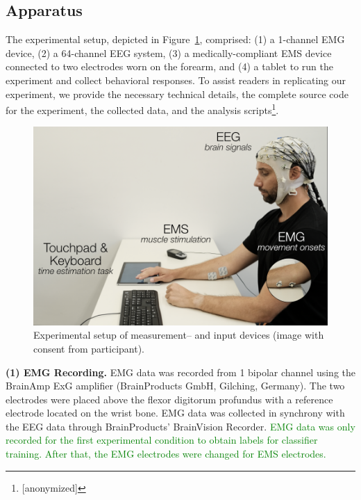 
\subsection{Apparatus}
The experimental setup, depicted in Figure~\ref{fig:setup}, comprised: (1) a 1-channel EMG device, (2) a 64-channel EEG system, (3) a medically-compliant EMS device connected to two electrodes worn on the forearm, and (4) a tablet to run the experiment and collect behavioral responses. To assist readers in replicating our experiment, we provide the necessary technical details, the complete source code for the experiment, the collected data, and the analysis scripts\footnote{[anonymized]}.

\begin{figure}[!h]
    \centering
    \includegraphics[width=\columnwidth]{figures/setup_fixed.png}
    \caption{Experimental setup of measurement-- and input devices (image with consent from participant).}
    \label{fig:setup}
\end{figure}

\indent\textbf{(1) EMG Recording.} EMG data was recorded from 1 bipolar channel using the BrainAmp ExG amplifier (BrainProducts GmbH, Gilching, Germany). The two electrodes were placed above the flexor digitorum profundus with a reference electrode located on the wrist bone. EMG data was collected in synchrony with the EEG data through BrainProducts' BrainVision Recorder. \textcolor{green}{EMG data was only recorded for the first experimental condition to obtain labels for classifier training. After that, the EMG electrodes were changed for EMS electrodes.}

